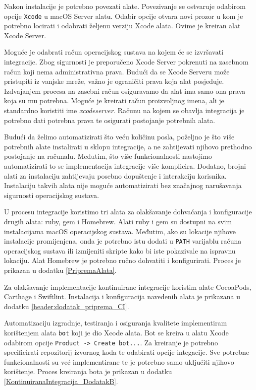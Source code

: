 \documentclass[times, utf8, diplomski, numeric]{fer}
\begin{document}
Nakon instalacije je potrebno povezati alate. Povezivanje se ostvaruje odabirom opcije \verb|Xcode| u macOS Server alatu. Odabir opcije otvara novi prozor u kom je potrebno locirati i odabrati željenu verziju Xcode alata. Ovime je kreiran alat Xcode Server.

Moguće je odabrati račun operacijskog sustava na kojem će se izvršavati integracije. Zbog sigurnosti je preporučeno Xcode Server pokrenuti na zasebnom račun koji nema administrativna prava. Budući da se Xcode Serveru može pristupiti iz vanjske mreže, važno je ograničiti prava koja alat posjeduje. Izdvajanjem procesa na zasebni račun osiguravamo da alat ima samo ona prava koja su mu potrebna. Moguće je kreirati račun proizvoljnog imena, ali je standardno koristiti ime \textit{xcodeserver}. Računu na kojem se obavlja integracija je potrebno dati potrebna prava te osigurati postojanje potrebnih alata.

Budući da želimo automatizirati što veću količinu posla, poželjno je što više potrebnih alate instalirati u sklopu integracije, a ne zahtijevati njihovo prethodno postojanje na računalu. Međutim, što više funkcionalnosti nastojimo automatizirati to se implementacija integracije više komplicira. Dodatno, brojni alati za instalaciju zahtijevaju posebno dopuštenje i interakciju korisnika. Instalaciju takvih alata nije moguće automatizirati bez značajnog narušavanja sigurnosti operacijskog sustava.

U procesu integracije koristimo tri alata za olakšavanje dohvaćanja i konfiguracije drugih alata: ruby, gem i Homebrew. Alati ruby i gem su dostupni na svim instalacijama macOS operacijskog sustava. Međutim, ako su lokacije njihove instalacije promijenjena, onda je potrebno istu dodati u \verb|PATH| varijablu računa operacijskog sustava ili izmijeniti skripte kako bi iste pokazivale na ispravnu lokaciju. Alat Homebrew je potrebno ručno dohvatiti i konfigurirati. Proces je prikazan u dodatku \ref{PripremaAlata}.

Za olakšavanje implementacije kontinuirane integracije koristim alate CocoaPods, Carthage i Swiftlint. Instalacija i konfiguracija navedenih alata je prikazana u dodatku \ref{header:dodatak_priprema_CI}.

Automatizaciju izgradnje, testiranja i osiguranja kvalitete implementiram korištenjem alata \verb|bot| koji je dio Xcode alata. Bot se kreira u alatu Xcode odabirom opcije \verb|Product -> Create bot...|. Za kreiranje je potrebno specificirati repozitorij izvornog koda te odabirati opcije integacije. Sve potrebne funkcionalnosti su već implementirane te je potrebno samo ukljućiti njihovo korištenje. Proces kreiranja bota je prikazan u dodatku \ref{KontinuiranaIntegracija_DodatakB}.
\end{document}
